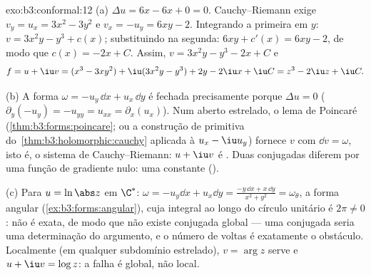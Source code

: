 \begin{solution}{exo:b3:conformal:12}
(a) $\Delta u = 6x - 6x + 0 = 0$. Cauchy--Riemann exige
$v_y = u_x = 3x^2 - 3y^2$ e $v_x = -u_y = 6xy - 2$.
Integrando a primeira em $y$: $v = 3x^2y - y^3 + c(x)$;
substituindo na segunda: $6xy + c'(x) = 6xy - 2$, de modo que $c(x)
= -2x + C$. Assim, $v = 3x^2y - y^3 - 2x + C$ e
\[
f = u + \iu v = (x^3 - 3xy^2) + \iu(3x^2y - y^3)
+ 2y - 2\iu x + \iu C = z^3 - 2\iu z + \iu C .
\]

(b) A forma $\omega = -u_y\,\dd x + u_x\,\dd y$ é fechada
precisamente porque $\Delta u = 0$ ($\partial_y(-u_y) =
-u_{yy} = u_{xx} = \partial_x(u_x)$). Num aberto estrelado,
o lema de Poincaré (\cref{thm:b3:forms:poincare}; ou
a construção de primitiva do~\cref{thm:b3:holomorphic:cauchy} aplicada à 
$u_x - \iu u_y$) fornece $v$ com $\dd v = \omega$, isto é,
o sistema de Cauchy--Riemann: $u + \iu v$ é . Duas
conjugadas diferem por uma função de gradiente nulo: uma
constante ().

(c) Para $u = \ln\abs z$ em $\C^*$: $\omega = -u_y\dd x +
u_x\dd y = \frac{-y\,\dd x + x\,\dd y}{x^2 + y^2} =
\omega_\theta$, a forma angular
(\cref{ex:b3:forms:angular}), cuja integral ao longo do círculo
unitário é $2\pi \neq 0$: não é exata, de modo que não existe conjugada global
--- uma conjugada seria uma determinação 
do argumento, e o número de voltas é exatamente o
obstáculo. Localmente (em qualquer subdomínio estrelado), $v =
\arg z$ serve e $u + \iu v = \log z$: a falha é
global, não local.
\end{solution}


